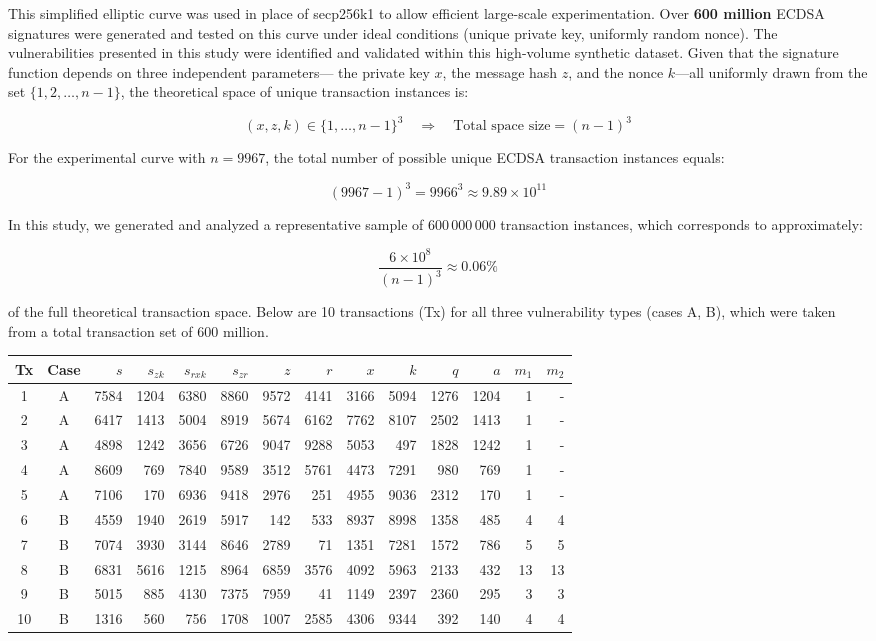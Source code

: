 \documentclass[11pt]{article}
\begin{document}
This simplified elliptic curve was used in place of secp256k1 to allow efficient large-scale experimentation. Over \textbf{600 million} ECDSA signatures were generated and tested on this curve under ideal conditions (unique private key, uniformly random nonce). The vulnerabilities presented in this study were identified and validated within this high-volume synthetic dataset. Given that the signature function depends on three independent parameters—
the private key $x$, the message hash $z$, and the nonce $k$—all uniformly drawn from the set $\{1, 2, \dots, n-1\}$,
the theoretical space of unique transaction instances is:

\[
(x, z, k) \in \{1, \dots, n-1\}^3 \quad \Rightarrow \quad \text{Total space size} = (n - 1)^3
\]

For the experimental curve with $n = 9967$, the total number of possible unique ECDSA transaction instances equals:

\[
(9967 - 1)^3 = 9966^3 \approx 9.89 \times 10^{11}
\]

In this study, we generated and analyzed a representative sample of $600\,000\,000$ transaction instances, which corresponds to approximately:

\[
\frac{6 \times 10^8}{(n - 1)^3} \approx 0.06\%
\]

of the full theoretical transaction space. Below are 10 transactions (Tx) for all three vulnerability types (cases A, B), which were taken from a total transaction set of 600 million.

\begin{center}
\small
\begin{tabular}{|c|c|r|r|r|r|r|r|r|r|r|r|r|r|}
\hline
Tx & Case & $s$ & $s_{zk}$ & $s_{rxk}$ & $s_{zr}$ & $z$ & $r$ & $x$ & $k$ & $q$ & $a$ & $m_1$ & $m_2$ \\
\hline
1 & A & 7584 & 1204 & 6380 & 8860 & 9572 & 4141 & 3166 & 5094 & 1276 & 1204 & 1 & - \\
2 & A & 6417 & 1413 & 5004 & 8919 & 5674 & 6162 & 7762 & 8107 & 2502 & 1413 & 1 & - \\
3 & A & 4898 & 1242 & 3656 & 6726 & 9047 & 9288 & 5053 & 497 & 1828 & 1242 & 1 & - \\
4 & A & 8609 & 769 & 7840 & 9589 & 3512 & 5761 & 4473 & 7291 & 980 & 769 & 1 & - \\
5 & A & 7106 & 170 & 6936 & 9418 & 2976 & 251 & 4955 & 9036 & 2312 & 170 & 1 & - \\
6 & B & 4559 & 1940 & 2619 & 5917 & 142 & 533 & 8937 & 8998 & 1358 & 485 & 4 & 4 \\
7 & B & 7074 & 3930 & 3144 & 8646 & 2789 & 71 & 1351 & 7281 & 1572 & 786 & 5 & 5 \\
8 & B & 6831 & 5616 & 1215 & 8964 & 6859 & 3576 & 4092 & 5963 & 2133 & 432 & 13 & 13 \\
9 & B & 5015 & 885 & 4130 & 7375 & 7959 & 41 & 1149 & 2397 & 2360 & 295 & 3 & 3 \\
10 & B & 1316 & 560 & 756 & 1708 & 1007 & 2585 & 4306 & 9344 & 392 & 140 & 4 & 4 \\
\hline
\end{tabular}
\end{center}
\end{document}
